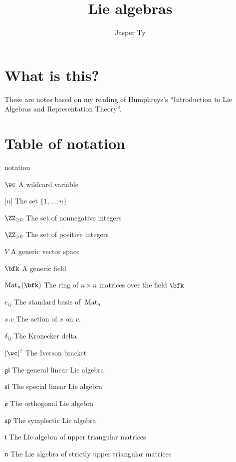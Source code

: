 \documentclass{article}
\title{Lie algebras}
\author{Jasper Ty}
\date{}
\DeclareMathOperator{\Mat}{Mat}
\newcommand*\glalg{\ensuremath{\mathfrak{gl}}}
\newcommand*\slalg{\ensuremath{\mathfrak{sl}}}
\newcommand*\spalg{\ensuremath{\mathfrak{sp}}}
\newcommand*\talg{\ensuremath{\mathfrak{t}}}
\newcommand*\nalg{\ensuremath{\mathfrak{n}}}
\newcommand*\oalg{\ensuremath{\mathfrak{o}}}
\newcommand*\acts{.}
\begin{document}
\maketitle

\section*{What is this?}

These are notes based on my reading of Humphreys's ``Introduction to Lie Algebras and Representation Theory''.

\tableofcontents

\newpage

\section*{Table of notation}

\begin{labeling}{notation}
    \item [$\wc$]
        A wildcard variable
    \item [$\lbrack n \rbrack$]
        The set $\{1, \ldots, n\}$
    \item [$\ZZ_{\geq 0}$]
        The set of nonnegative integers
    \item [$\ZZ_{>0}$]
        The set of positive integers
    \item [$V$]
        A generic vector space
    \item [$\bfk$]
        A generic field
    \item [$\Mat_n(\bfk)$]
        The ring of $n \times n$ matrices over the field $\bfk$
    \item [$e_{ij}$]
        The standard basis of $\Mat_n$
    \item [$x \acts v$]
        The action of $x$ on $v$.
    \item [$\delta_{ij}$]
        The Kronecker delta
    \item [$\lbrack \wc \rbrack^?$]
        The Iverson bracket
    \item [$\glalg$]
        The general linear Lie algebra
    \item [$\slalg$]
        The special linear Lie algebra
    \item [$\oalg$]
        The orthogonal Lie algebra
    \item [$\spalg$]
        The symplectic Lie algebra
    \item [$\talg$]
        The Lie algebra of upper triangular matrices
    \item [$\nalg$]
        The Lie algebra of strictly upper triangular matrices
\end{labeling}
\end{document}
